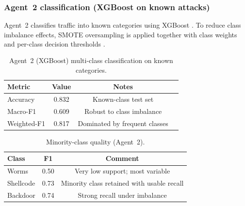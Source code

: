 \documentclass[conference]{IEEEtran}
\begin{document}
\subsubsection{Agent~2 classification (XGBoost on known attacks)}
Agent~2 classifies traffic into known categories using XGBoost \cite{Chen2016XGBoost}. To reduce class imbalance effects, SMOTE oversampling is applied together with class weights and per-class decision thresholds \cite{Chawla2002SMOTE}.

\begin{table}[H]
\caption{Agent~2 (XGBoost) multi-class classification on known categories.}
\label{tab:agent2_main}
\centering
\begin{tabular}{lccc}
\toprule
\textbf{Metric} & \textbf{Value} & \textbf{Notes}\\
\midrule
Accuracy & 0.832 & Known-class test set\\
Macro-F1 & 0.609 & Robust to class imbalance\\
Weighted-F1 & 0.817 & Dominated by frequent classes\\
\bottomrule
\end{tabular}
\end{table}

\begin{table}[H]
\caption{Minority-class quality (Agent~2).}
\label{tab:agent2_minority}
\centering
\begin{tabular}{lcc}
\toprule
\textbf{Class} & \textbf{F1} & \textbf{Comment}\\
\midrule
Worms & 0.50 & Very low support; most variable\\
Shellcode & 0.73 & Minority class retained with usable recall\\
Backdoor & 0.74 & Strong recall under imbalance\\
\bottomrule
\end{tabular}
\end{table}

\begin{table}[t]
\caption{Per-class F1-score (\%) for Agent~2 (XGBoost) on known UNSW-NB15 categories (held-out test set).}
\label{tab:agent2_perclass}
\centering
\footnotesize
\setlength{\tabcolsep}{3.8pt}
\end{table}
\end{document}
